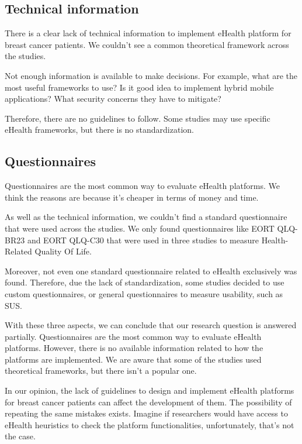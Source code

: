 \documentclass[conference]{IEEEtran}
\begin{document}
\subsection{Technical information}

There is a clear lack of technical information to implement eHealth platform for breast cancer patients. We couldn't see a common theoretical framework across the studies.

Not enough information is available to make decisions. For example, what are the most useful frameworks to use? Is it good idea to implement hybrid mobile applications? What security concerns they have to mitigate? 

Therefore, there are no guidelines to follow. Some studies may use specific eHealth frameworks, but there is no standardization.

\subsection{Questionnaires}

Questionnaires are the most common way to evaluate eHealth platforms. We think the reasons are because it's cheaper in terms of money and time.

As well as the technical information, we couldn't find a standard questionnaire that were used across the studies. We only found questionnaires like EORT QLQ-BR23 and EORT QLQ-C30 that were used in three studies to measure Health-Related Quality Of Life.

Moreover, not even one standard questionnaire related to eHealth exclusively was found. Therefore, due the lack of standardization, some studies decided to use custom questionnaires, or general questionnaires to measure usability, such as SUS.

With these three aspects, we can conclude that our research question is answered partially. Questionnaires are the most common way to evaluate eHealth platforms. However, there is no available information related to how the platforms are implemented. We are aware that some of the studies used theoretical frameworks, but there isn't a popular one.

In our opinion, the lack of guidelines to design and implement eHealth platforms for breast cancer patients can affect the development of them. The possibility of repeating the same mistakes exists. Imagine if researchers would have access to eHealth heuristics to check the platform functionalities, unfortunately, that's not the case.
\end{document}
